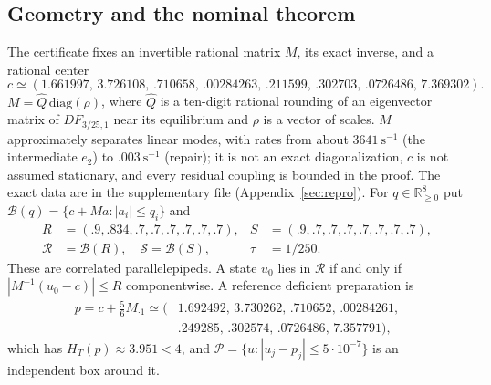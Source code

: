 \documentclass[11pt,a4paper]{article}
\theoremstyle{plain}
\theoremstyle{definition}
\theoremstyle{remark}
\newcommand{\R}{\mathbb R}
\newcommand{\HT}{H_T}
\newcommand{\RR}{\mathcal R}
\newcommand{\SSS}{\mathcal S}
\newcommand{\Pp}{\mathcal P}
\begin{document}
\subsection{Geometry and the nominal theorem}
The certificate fixes an invertible rational matrix $M$, its exact inverse,
and a rational center
\begin{equation}\label{eq:center}
c\simeq(1.661997,\,3.726108,\,.710658,\,.00284263,\,.211599,\,.302703,\,.0726486,\,7.369302).
\end{equation}
$M=\widehat Q\,\mathrm{diag}(\rho)$, where $\widehat Q$ is a ten-digit rational
rounding of an eigenvector matrix of $DF_{3/25,1}$ near its equilibrium and
$\rho$ is a vector of scales. $M$ approximately separates linear modes, with
rates from about $3641~\mathrm s^{-1}$ (the intermediate $e_2$) to
$.003~\mathrm s^{-1}$ (repair); it is not an exact diagonalization, $c$ is not
assumed stationary, and every residual coupling is bounded in the proof. The
exact data are in the supplementary file 
(Appendix~\ref{sec:repro}). For $q\in\R^8_{\ge0}$ put
$\mathcal B(q)=\{c+Ma:|a_i|\le q_i\}$ and
\begin{align}
R&=(.9,.834,.7,.7,.7,.7,.7,.7),& S&=(.9,.7,.7,.7,.7,.7,.7,.7),\nonumber\\
\RR&=\mathcal B(R),\quad\SSS=\mathcal B(S),& \tau&=1/250.\label{eq:radii}
\end{align}
These are correlated parallelepipeds. A state $u_0$ lies in $\RR$ if and only
if $|M^{-1}(u_0-c)|\le R$ componentwise. A reference deficient preparation is
\begin{equation}\label{eq:prep}
\begin{aligned}
p=c+\tfrac56M_{\cdot1}\simeq(&1.692492,\,3.730262,\,.710652,\,.00284261,\\
&.249285,\,.302574,\,.0726486,\,7.357791),
\end{aligned}
\end{equation}
which has $\HT(p)\approx3.951<4$, and
$\Pp=\{u:|u_j-p_j|\le5\cdot10^{-7}\}$ is an independent box around it.
\end{document}
